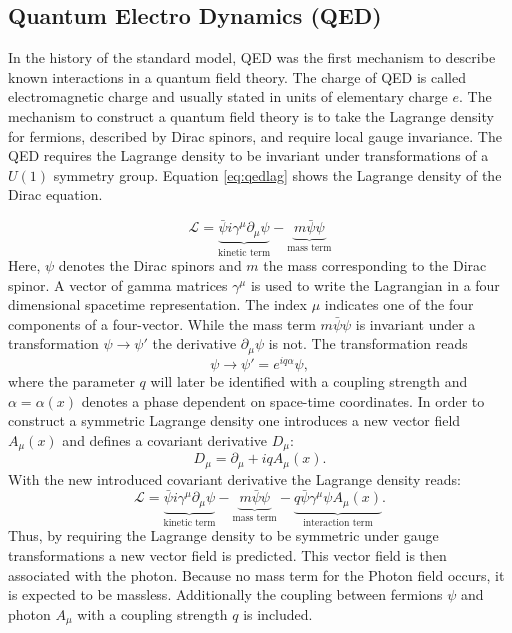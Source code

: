 	\subsection{Quantum Electro Dynamics (QED)}
	In the history of the standard model, QED was the first mechanism to describe known interactions in a quantum field theory. The charge of QED is called electromagnetic charge and usually stated in units of elementary charge $e$. The mechanism to construct a quantum field theory is to take the Lagrange density for fermions, described by Dirac spinors, and require local gauge invariance. The QED requires the Lagrange density to be invariant under transformations of a $U(1)$ symmetry group. Equation \ref{eq:qedlag} shows the Lagrange density of the Dirac equation. 
	
	\begin{equation}
	\mathcal{L} = \underbrace{\bar{\psi} i \gamma^\mu \partial_\mu \psi}_{\text{kinetic term}} - \underbrace{m \bar{\psi} \psi}_{\text{mass term}}
	\label{eq:qedlag}
	\end{equation}
	Here, $\psi$ denotes the Dirac spinors and $m$ the mass corresponding to the Dirac spinor. A vector of gamma matrices $\gamma^\mu$ is used to write the Lagrangian in a four dimensional spacetime representation. The index $\mu$ indicates one of the four components of a four-vector. While the mass term $m \bar{\psi} \psi$ is invariant under a transformation $\psi \rightarrow \psi'$ the derivative $\partial_\mu \psi$ is not. The transformation reads
	\begin{equation}
	\psi \rightarrow \psi' = e^{i q \alpha} \psi,
	\label{eq:trafo}
	\end{equation}
	where the parameter $q$ will later be identified with a coupling strength and $\alpha = \alpha(x)$ denotes a phase dependent on space-time coordinates. In order to construct a symmetric Lagrange density one introduces a new vector field $A_\mu(x)$ and defines a covariant derivative $D_\mu$:
	\begin{equation}
	D_\mu = \partial_\mu + i q A_\mu(x).
	\end{equation}
	With the new introduced covariant derivative the Lagrange density reads:
	\begin{equation}
	\mathcal{L} = \underbrace{\bar{\psi} i \gamma^\mu \partial_\mu \psi}_{\text{kinetic term}} - \underbrace{m \bar{\psi} \psi}_{\text{mass term}} - \underbrace{q \bar{\psi} \gamma^\mu \psi A_\mu(x)}_{\text{interaction term}}.
	\end{equation}
	Thus, by requiring the Lagrange density to be symmetric under gauge transformations a new vector field is predicted. This vector field is then associated with the photon. Because no mass term for the Photon field occurs, it is expected to be massless. Additionally the coupling between fermions $\psi$ and photon $A_\mu$ with a coupling strength $q$ is included. \cite{ModernParticlePhysics}
	
